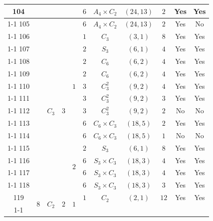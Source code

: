 \documentclass[12pt]{amsart}
\numberwithin{equation}{section}
\theoremstyle{plain}
\theoremstyle{definition}
\theoremstyle{remark}
\begin{document}
{\begin{longtable}{|c|c|c|c|c|c|c|c|c|c|c|}
104 &  &  &  &  & $6$ & \multicolumn{1}{c|}{$A_4\times C_2$} & $(24,13)$ & $2$ & Yes & Yes \\ \cline{1-1} \cline{6-11}
105 &  &  &  &  & $6$ & \multicolumn{1}{c|}{$A_4\times C_2$} & $(24,13)$ & $2$ & Yes & No \\ \cline{1-1} \cline{3-11}
106 &  & \multirow[t]{13}{*}{$C_3$} & \multirow[t]{13}{*}{$3$} & \multirow[t]{9}{*}{$1$} & $1$ & \multicolumn{1}{c|}{$C_{3}$} & $(3,1)$ & $8$ & Yes & Yes \\ \cline{1-1} \cline{6-11}
107 &  &  &  &  & $2$ & \multicolumn{1}{c|}{$S_3$} & $(6,1)$ & $4$ & Yes & Yes \\ \cline{1-1} \cline{6-11}
108 &  &  &  &  & $2$ & \multicolumn{1}{c|}{$C_{6}$} & $(6,2)$ & $4$ & Yes & Yes \\ \cline{1-1} \cline{6-11}
109 &  &  &  &  & $2$ & \multicolumn{1}{c|}{$C_{6}$} & $(6,2)$ & $4$ & Yes & Yes \\ \cline{1-1} \cline{6-11}
110 &  &  &  &  & $3$ & \multicolumn{1}{c|}{$C_3^2$} & $(9,2)$ & $4$ & Yes & Yes \\ \cline{1-1} \cline{6-11}
111 &  &  &  &  & $3$ & \multicolumn{1}{c|}{$C_3^2$} & $(9,2)$ & $3$ & Yes & Yes \\ \cline{1-1} \cline{6-11}
112 &  &  &  &  & $3$ & \multicolumn{1}{c|}{$C_3^2$} & $(9,2)$ & $2$ & No & No \\ \cline{1-1} \cline{6-11}
113 &  &  &  &  & $6$ & \multicolumn{1}{c|}{$C_{6} \times C_{3}$} & $(18,5)$ & $2$ & Yes & Yes \\ \cline{1-1} \cline{6-11}
114 &  &  &  &  & $6$ & \multicolumn{1}{c|}{$C_{6} \times C_{3}$} & $(18,5)$ & $1$ & No & No \\ \cline{1-1} \cline{5-11}
115 &  &  &  & \multirow[t]{4}{*}{$2$} & $2$ & \multicolumn{1}{c|}{$S_3$} & $(6,1)$ & $8$ & Yes & Yes \\ \cline{1-1} \cline{6-11}
116 &  &  &  &  & $6$ & \multicolumn{1}{c|}{$S_3\times C_3$} & $(18,3)$ & $4$ & Yes & Yes \\ \cline{1-1} \cline{6-11}
117 &  &  &  &  & $6$ & \multicolumn{1}{c|}{$S_3\times C_3$} & $(18,3)$ & $4$ & Yes & Yes \\ \cline{1-1} \cline{6-11}
118 &  &  &  &  & $6$ & \multicolumn{1}{c|}{$S_3\times C_3$} & $(18,3)$ & $3$ & Yes & Yes \\ \hline
119 & \multirow[t]{13}{*}{$8$} & \multirow[t]{13}{*}{$C_2$} & \multirow[t]{13}{*}{$2$} & \multirow[t]{13}{*}{$1$} & $1$ & \multicolumn{1}{c|}{$C_{2}$} & $(2,1)$ & $12$ & Yes & Yes \\ \cline{1-1} \cline{6-11}

\end{longtable}}
\end{document}
